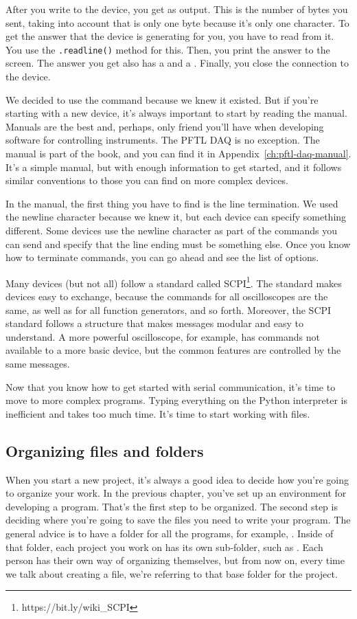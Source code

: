 After you write to the device, you get  as output. This is the number of bytes you sent, taking into account that \texttt{\n} is only one byte because it's only one character. To get the answer that the device is generating for you, you have to read from it. You use the \texttt{.readline()} method for this. Then, you print the answer to the screen. The answer you get also has a \py{\n} and a . Finally, you close the connection to the device.

We decided to use the  command because we knew it existed. But if you're starting with a new device, it's always important to start by reading the manual. Manuals are the best and, perhaps, only friend you'll have when developing software for controlling instruments. The {PFTL DAQ} is no exception. The manual is part of the book, and you can find it in Appendix~\ref{ch:pftl-daq-manual}. It's a simple manual, but with enough information to get started, and it follows similar conventions to those you can find on more complex devices.

In the manual, the first thing you have to find is the line termination. We used the newline character because we knew it, but each device can specify something different. Some devices use the newline character as part of the commands you can send and specify that the line ending must be something else. Once you know how to terminate commands, you can go ahead and see the list of options.

Many devices (but not all) follow a standard called SCPI\footnote{https://bit.ly/wiki\_SCPI}. The standard makes devices easy to exchange, because the commands for all oscilloscopes are the same, as well as for all function generators, and so forth. Moreover, the SCPI standard follows a structure that makes messages modular and easy to understand. A more powerful oscilloscope, for example, has commands not available to a more basic device, but the common features are controlled by the same messages.

Now that you know how to get started with serial communication, it's time to move to more complex programs. Typing everything on the Python interpreter is inefficient and takes too much time. It's time to start working with files.

\subsection{Organizing files and folders}\label{subsec:organizing-files-and-folders}
When you start a new project, it's always a good idea to decide how you're going to organize your work. In the previous chapter, you've set up an environment for developing a program. That's the first step to be organized. The second step is deciding where you're going to save the files you need to write your program. The general advice is to have a folder for all the programs, for example, . Inside of that folder, each project you work on has its own sub-folder, such as . Each person has their own way of organizing themselves, but from now on, every time we talk about creating a file, we're referring to that base folder for the project.


